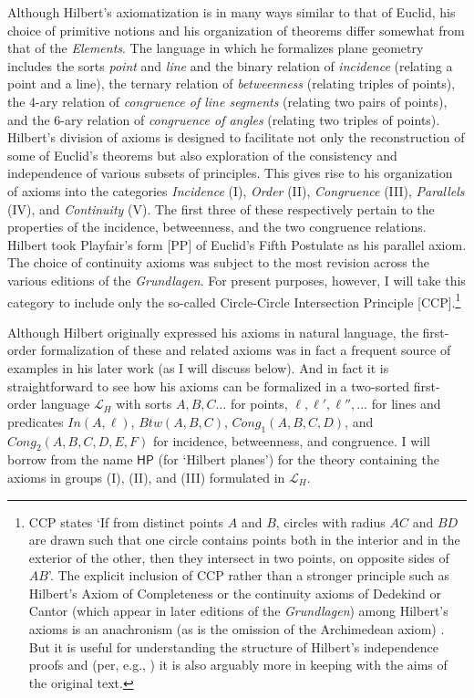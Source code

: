 \documentclass[11pt,fleqn,leqno]{article}
\begin{document}
Although Hilbert's axiomatization is in many ways similar to that of Euclid, his choice of primitive notions and his organization of theorems differ somewhat from that of the \textsl{Elements}.   The language in which he formalizes plane geometry includes the sorts \textsl{point} and \textsl{line} and the binary relation of \textsl{incidence} (relating a point and a line), the ternary relation of \textsl{betweenness} (relating triples of points), the 4-ary relation of \textsl{congruence of line segments} (relating two pairs of points), and the 6-ary relation of \textsl{congruence of angles} (relating two triples of points).  Hilbert's division of axioms is designed to facilitate not only the reconstruction of some of Euclid's theorems but also  exploration of the consistency and independence of various subsets of principles.   This gives rise to his organization of axioms into the categories \textsl{Incidence} (I), \textsl{Order} (II), \textsl{Congruence} (III), \textsl{Parallels} (IV), and \textsl{Continuity} (V).   The first three of these respectively pertain to the properties of the incidence,  betweenness, and the two congruence relations.  Hilbert took Playfair's form  [PP] of Euclid's Fifth Postulate as his parallel axiom.  The choice of continuity axioms was subject to the most revision across the various editions of the \textsl{Grundlagen}.   For present purposes, however, I will take this category to include only the so-called Circle-Circle Intersection Principle [CCP].\footnote{CCP states `If from distinct points $A$ and $B$, circles with radius $AC$ and $BD$ are drawn such that one circle contains points both in the interior and in the exterior of the other, then they intersect in two points, on opposite sides of $AB$'.   The explicit inclusion of CCP rather than a stronger principle such as Hilbert's Axiom of Completeness or the continuity axioms of Dedekind or Cantor (which appear in later editions of the \textsl{Grundlagen}) among Hilbert's axioms is an anachronism (as is the omission of the Archimedean axiom) .  But it is useful for understanding the structure of Hilbert's independence proofs and (per, e.g., \citealp{Baldwin2018}) it is also arguably more in keeping with the aims of the original text.}    

Although Hilbert originally expressed his axioms in natural language, the first-order formalization of these and related axioms was in fact a frequent source of examples in his later work (as I will discuss below).  And in fact it is straightforward to see how his axioms can be formalized in a two-sorted first-order language $\mathcal{L}_H$ with sorts $A,B,C\ldots$ for points, $\ell,\ell',\ell'',\ldots$ for lines and predicates $\mathit{In}(A,\ell)$, $\mathit{Btw}(A,B,C)$, $\mathit{Cong}_1(A,B,C,D)$, and $\mathit{Cong}_2(A,B,C,D,E,F)$ for incidence, betweenness, and congruence.  I will borrow from  \citet{Baldwin2018} the name $\mathsf{HP}$ (for `Hilbert planes') for the theory containing the axioms in groups (I), (II), and (III) formulated in $\mathcal{L}_H$.
\end{document}
